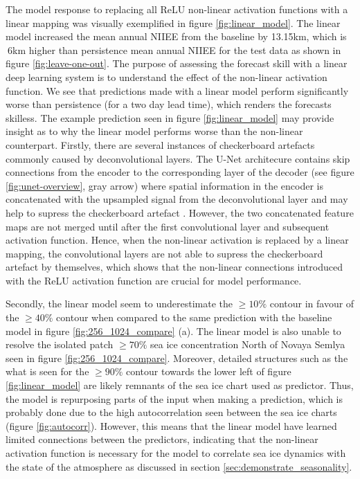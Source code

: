 \documentclass[../main/thesis]{subfiles}
\begin{document}
The model response to replacing all ReLU non-linear activation functions \citep{Nair2010} with a linear mapping was visually exemplified in figure \ref{fig:linear_model}. The linear model increased the mean annual NIIEE from the baseline by 13.15km, which is $~ 6$km higher than persistence mean annual NIIEE for the test data as shown in figure \ref{fig:leave-one-out}. The purpose of assessing the forecast skill with a linear deep learning system is to understand the effect of the non-linear activation function. We see that predictions made with a linear model perform significantly worse than persistence (for a two day lead time), which renders the forecasts skilless. The example prediction seen in figure \ref{fig:linear_model} may provide insight as to why the linear model performs worse than the non-linear counterpart. Firstly, there are several instances of checkerboard artefacts commonly caused by deconvolutional layers. The U-Net architecure contains skip connections from the encoder to the corresponding layer of the decoder (see figure \ref{fig:unet-overview}, gray arrow) where spatial information in the encoder is concatenated with the upsampled signal from the deconvolutional layer and may help to supress the checkerboard artefact \citep{Ronneberger2015}. However, the two concatenated feature maps are not merged until after the first convolutional layer and subsequent activation function. Hence, when the non-linear activation is replaced by a linear mapping, the convolutional layers are not able to supress the checkerboard artefact by themselves, which shows that the non-linear connections introduced with the ReLU activation function are crucial for model performance.

Secondly, the linear model seem to underestimate the $\geq 10\%$ contour in favour of the $\geq 40\%$ contour when compared to the same prediction with the baseline model in figure \ref{fig:256_1024_compare} (a). The linear model is also unable to resolve the isolated patch $\geq 70\%$ sea ice concentration North of Novaya Semlya seen in figure \ref{fig:256_1024_compare}. Moreover, detailed structures such as the what is seen for the $\geq 90\%$ contour towards the lower left of figure \ref{fig:linear_model} are likely remnants of the sea ice chart used as predictor. Thus, the model is repurposing parts of the input when making a prediction, which is probably done due to the high autocorrelation seen between the sea ice charts (figure \ref{fig:autocorr}). However, this means that the linear model have learned limited connections between the predictors, indicating that the non-linear activation function is necessary for the model to correlate sea ice dynamics with the state of the atmosphere as discussed in section \ref{sec:demonstrate_seasonality}.
\end{document}
